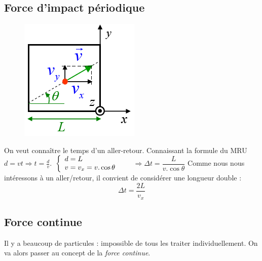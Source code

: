 \documentclass	[11pt, a4paper, openany]{book}
\begin{document}
\subsection{Force d'impact périodique}
\begin{figure}
\includegraphics[scale=0.4]{th/image7.png}
\end{figure}
On veut connaître le temps d'un aller-retour. Connaissant la formule du MRU $d = vt \Rightarrow t = \frac{d}{v}$.
$\\
\left\{\begin{array}{l}
d = L\\
v = v_x = v.\cos\theta
\end{array}\right.
$ \ \ \ $\Rightarrow \Delta t = \dfrac{L}{v.\cos\theta}$
Comme nous nous intéressons à un aller/retour, il convient de considérer une longueur double :
\begin{equation}
\Delta t = \frac{2L}{v_x}
\end{equation}
\subsection{Force continue}
Il y a beaucoup de particules : impossible de tous les traiter individuellement. On va alors passer au concept de la \textit{force continue}.
\end{document}
